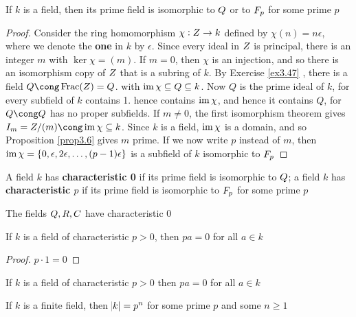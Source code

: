 \documentclass[11pt]{article}
\DeclareMathOperator{\Frac}{Frac}
\begin{document}
\begin{proposition}[]
If \(k\) is a field, then its prime field is isomorphic to \(\relax{Q}\) or to \(\relax{F}_p\)
for some prime \(p\)
\end{proposition}

\begin{proof}
Consider the ring homomorphism \(\chi:\relax{Z}\to k\) defined by \(\chi(n)=n\epsilon\),
where we denote the \textbf{one} in \(k\) by \(\epsilon\). Since every ideal in \(\relax{Z}\) is
principal, there is an integer \(m\) with \(\ker\chi=(m)\). If \(m=0\), then
\(\chi\) is an injection, and so there is an isomorphism copy of \(\relax{Z}\) that is a
subring of \(k\). By Exercise \ref{ex3.47} , there is a field
\(Q\cong\Frac(\Z)=\Q\). with \(\operatorname{im}\chi\subseteq Q\subseteq k\). Now \(Q\)
is the prime ideal of \(k\), for every subfield of \(k\) contains 1. hence
contains \(\operatorname{im}\chi\), and hence it contains \(Q\), for \(Q\cong\Q\) has no
proper subfields. If \(m\neq0\), the first isomorphism theorem gives
\(\I_m=\Z/(m)\cong\im\chi\subseteq k\). Since \(k\) is a field, \(\operatorname{im}\chi\) is
a domain, and so Proposition \ref{prop3.6} gives \(m\) prime. If we now write \(p\)
instead of \(m\), then \(\operatorname{im}\chi=\{0,\epsilon,2\epsilon,\dots,(p-1)\epsilon\}\) is a
subfield of \(k\) isomorphic to \(\relax{F}_p\)
\end{proof}

\begin{definition}[]
A field \(k\) has \textbf{characteristic 0} if its prime field is isomorphic to \(\relax{Q}\);
a field \(k\) has \textbf{characteristic \(p\)} if its prime field is isomorphic to
\(\relax{F}_p\) for some prime \(p\)
\end{definition}

The fields \(\relax{Q},\relax{R},\relax{C}\) have characteristic 0

\begin{proposition}[]
If \(k\) is a field of characteristic \(p>0\), then \(pa=0\) for all \(a\in k\)
\end{proposition}

\begin{proof}
\(p\cdot 1=0\)
\end{proof}

\begin{proposition}[]
If \(k\) is a field of characteristic \(p>0\) then \(pa=0\) for all \(a\in k\)
\end{proposition}

\begin{proposition}[]
If \(k\) is a finite field, then \(\abs{k}=p^n\) for some prime \(p\) and some \(n\ge1\)
\end{proposition}
\end{document}
